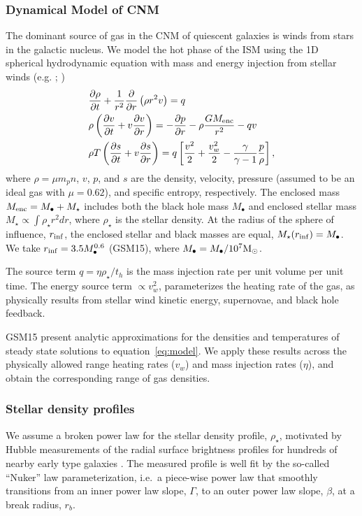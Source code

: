 \documentclass[usenatbib,fleqn]{mnras}
\newcommand{\Mbh}[1][]{M_{\bullet}}
\newcommand{\Menc}{M_{\rm enc}}
\renewcommand{\th}{t_h}
\newcommand{\Msun}{{\rm M_\odot}}
\begin{document}
\subsubsection{Dynamical Model of CNM}
\label{sec:model}

The dominant source of gas in the CNM of quiescent galaxies is winds
from stars in the galactic nucleus. We model the hot phase of the ISM
using the 1D spherical hydrodynamic equation with mass and energy
injection from stellar winds (e.g. \citealt{Holzer+1970};
\citealt{Quataert2004})
\begin{align}
  &\frac{\partial \rho}{\partial t}+\frac{1}{r^2}\frac{\partial}{\partial r}\left(\rho r^2 v\right)=q \label{eq:drhodt}\\
  &\rho \left(\frac{\partial v}{\partial t} + v\frac{\partial
      v}{\partial r}\right) =-\frac{\partial p}{\partial r}- \rho\frac{GM_{\rm enc}}{r^{2}} -q v \label{eq:dvdt}\\
  &\rho T\left(\frac{\partial s}{\partial t} + v\frac{\partial
      s}{\partial
      r}\right)=q\left[\frac{v^2}{2}+\frac{v_w^2}{2}-\frac{\gamma}{\gamma-1}
    \frac{p}{\rho} \right] ,
\label{eq:model}
\end{align}
where $\rho = \mu m_p n$, $v$, $p$, and $s$ are the density, velocity,
pressure (assumed to be an ideal gas with $\mu = 0.62$), and specific
entropy, respectively.  The enclosed mass $\Menc = M_{\bullet} +
M_{\star}$ includes both the black hole mass $M_{\bullet}$ and
enclosed stellar mass $M_{\star} \propto \int \rho_{\star}r^{2}dr$,
where $\rho_{\star}$ is the stellar density. At the radius of the
sphere of influence, $r_{\rm inf}$, the enclosed stellar and black
masses are equal, $M_{\star}(r_{\rm inf})=\Mbh$.  We take $r_{\rm
  inf}=3.5 \Mbh[,7]^{0.6}$ (GSM15), where $\Mbh[,7]=\Mbh/10^7 \Msun$.

The source term $q =\eta \rho_\star/\th$ is the mass injection
rate per unit volume per unit time. The energy source term $\propto
v_w^{2}$, parameterizes the heating rate of the gas, as physically
results from stellar wind kinetic energy, supernovae, and black hole
feedback.

GSM15 present analytic approximations for the
densities and temperatures of steady state solutions to
equation~\eqref{eq:model}. We apply these results across the
physically allowed range heating rates ($v_w$) and mass injection
rates ($\eta$), and obtain the corresponding range of gas densities.

\subsubsection{Stellar density profiles}
We assume a broken power law for the stellar density profile,
$\rho_{\star}$, motivated by Hubble measurements of the radial surface
brightness profiles for hundreds of nearby early type galaxies
\citep{Lauer+2007}.  The measured profile is well fit by the so-called
``Nuker'' law parameterization, i.e.~a piece-wise power law that smoothly
transitions from an inner power law slope, $\Gamma$, to an outer power
law slope, $\beta$, at a break radius, $r_b$.
\end{document}

